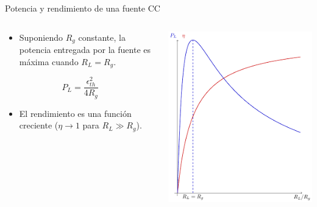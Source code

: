 \documentclass[aspectratio=169, usenames,svgnames,dvipsnames]{beamer}
\begin{document}
\begin{frame}[label={sec:orgf6b6678}]{Potencia y rendimiento de una fuente CC}
\begin{columns}
\begin{column}{0.5\columnwidth}
\begin{itemize}
\item Suponiendo \(R_g\) constante, la potencia entregada por la fuente es máxima cuando \(R_L = R_g\).
\end{itemize}

\begin{equation*}
  P_L = \frac{\epsilon^2_{th}}{4 R_g}
\end{equation*}

\begin{itemize}
\item El rendimiento es una función creciente (\(\eta \to 1\) para \(R_L \gg R_g\)).
\end{itemize}
\end{column}

\begin{column}{0.5\columnwidth}
\begin{center}
\includegraphics[height=0.85\textheight]{../figs/FuenteReal_PotenciaRendimiento.pdf}
\end{center}
\end{column}
\end{columns}
\end{frame}
\end{document}
